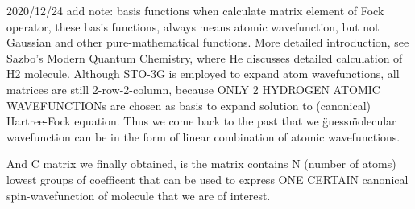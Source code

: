 2020/12/24 add note:
basis functions when calculate matrix element of Fock operator, these basis functions, always means atomic wavefunction, but not Gaussian and other pure-mathematical functions.
More detailed introduction, see Sazbo's Modern Quantum Chemistry, where He discusses detailed calculation of H2 molecule. Although STO-3G is employed to expand atom wavefunctions, all matrices are still 2-row-2-column, because ONLY 2 HYDROGEN ATOMIC WAVEFUNCTIONs are chosen as basis to expand solution to (canonical) Hartree-Fock equation.
Thus we come back to the past that we \"guess\" molecular wavefunction can be in the form of linear combination of atomic wavefunctions.

And C matrix we finally obtained, is the matrix contains N (number of atoms) lowest groups of coefficent that can be used to express ONE CERTAIN canonical spin-wavefunction of molecule that we are of interest.

